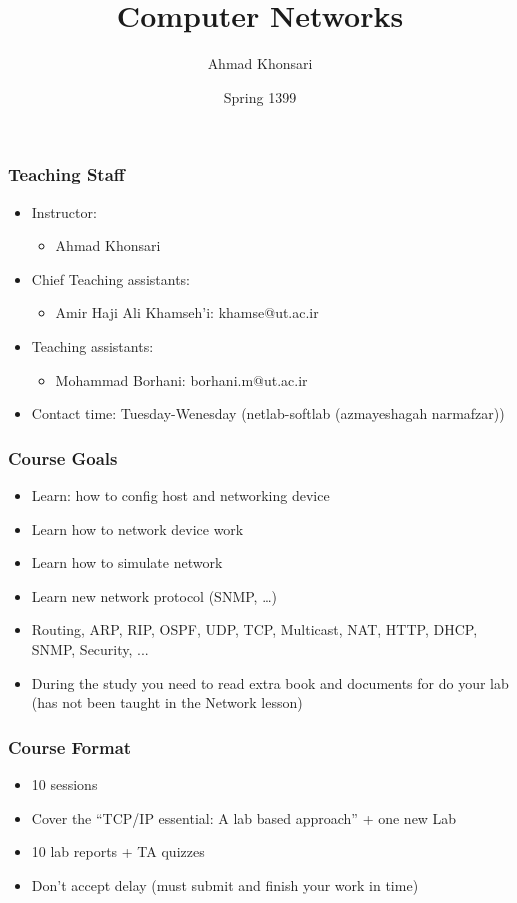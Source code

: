 \documentclass[15pt]{beamer}
\title{Computer Networks}
\author{Ahmad Khonsari}
\institute{\url{http://ece.ut.ac.ir/portal/}}
\date{Spring 1399}
\begin{document}
\frame{\titlepage}

\begin{frame}
\frametitle{Teaching Staff}
\begin{itemize}
    \item Instructor:
    \begin{itemize}
        \item Ahmad Khonsari
    \end{itemize}
    \item Chief Teaching assistants:
    \begin{itemize}
        \item Amir Haji Ali Khamseh’i: khamse@ut.ac.ir
    \end{itemize}
    \item Teaching assistants:
    \begin{itemize}
        \item Mohammad Borhani: borhani.m@ut.ac.ir
    \end{itemize}
    \item Contact time: Tuesday-Wenesday (netlab-softlab (azmayeshagah narmafzar))
\end{itemize}

\end{frame}

\begin{frame}
    \frametitle{Course Goals}

    \begin{itemize}
        \item Learn: how to config host and networking device
        \item Learn how to network device work
        \item Learn how to simulate network
        \item Learn new network protocol (SNMP, \dots)
        \item Routing, ARP, RIP, OSPF, UDP, TCP, Multicast, NAT, HTTP, DHCP, SNMP, Security, ...         
        \item During the study you need to read extra book and documents for do your lab (has not been taught in the Network lesson)
    \end{itemize}

\end{frame}

\begin{frame}
    \frametitle{Course Format}

    \begin{itemize}
        \item 10 sessions
        \item Cover the “TCP/IP essential: A lab based approach” + one new Lab
        \item 10 lab reports + TA quizzes
        \item {\color{red} Don’t accept delay (must submit and finish your work in time)}
    \end{itemize}

\end{frame}
\end{document}
